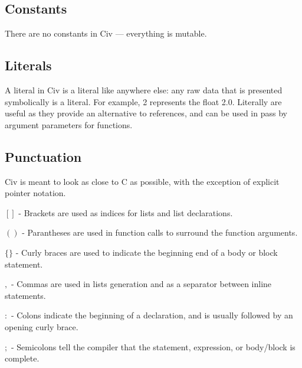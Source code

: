 \documentclass[a4paper]{article}
\begin{document}
\begin{multicols}{2}
\noindent 
{}
\end{multicols}


\subsection{Constants}

There are no constants in Civ — everything is mutable.

\subsection{Literals}

A literal in Civ is a literal like anywhere else: any raw data that is presented symbolically is a literal. For example, 2 represents the float 2.0. Literally are useful as they provide an alternative to references, and can be used in pass by argument parameters for functions.

\subsection{Punctuation}

Civ is meant to look as close to C as possible, with the exception of explicit pointer notation.

\begin{description}
	\item{$[]$} - Brackets are used as indices for lists and list declarations.
	\item{$()$} - Parantheses are used in function calls to surround the function arguments.
    \item{$\{\}$} - Curly braces are used to indicate the beginning end of a body or block statement.
    \item{$,$} - Commas are used in lists generation and as a separator between inline statements.
    \item{$:$} - Colons indicate the beginning of a declaration, and is usually followed by an opening curly brace.
    \item{$;$} - Semicolons tell the compiler that the statement, expression, or body/block is complete.
\end{description}
\end{document}
